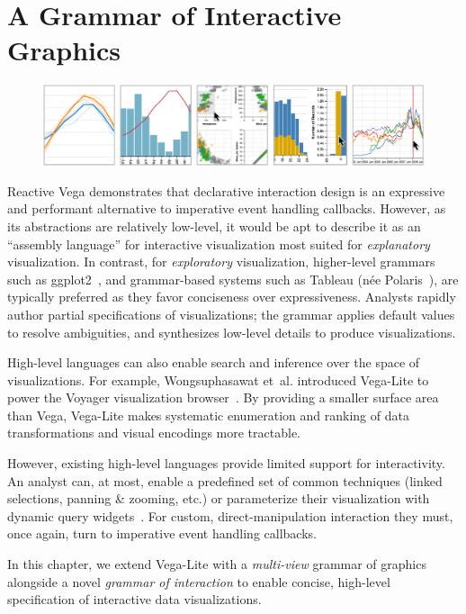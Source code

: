 \graphicspath{{./vega-lite/figures/}}
\chapter{A Grammar of Interactive Graphics}

\begin{figure}[h!]
  \vspace{-30pt}
  \centering
  \includegraphics[width=\columnwidth]{teaser}
\end{figure}


Reactive Vega demonstrates that declarative interaction design is an expressive
and performant alternative to imperative event handling callbacks. However, as
its abstractions are relatively low-level, it would be apt to describe it as an
``assembly language'' for interactive visualization most suited for
\emph{explanatory} visualization. In contrast, for \emph{exploratory}
visualization, higher-level grammars such as ggplot2~\cite{wickham:layered}, and
grammar-based systems such as Tableau (n\'ee Polaris~\cite{stolte:polaris}), are
typically preferred as they favor conciseness over expressiveness. Analysts
rapidly author partial specifications of visualizations; the grammar applies
default values to resolve ambiguities, and synthesizes low-level details to
produce visualizations.

High-level languages can also enable search and inference over the space of
visualizations. For example, Wongsuphasawat et~al. introduced Vega-Lite to power
the Voyager visualization browser~\cite{voyager}. By providing a smaller surface
area than Vega, Vega-Lite makes systematic enumeration and ranking of data
transformations and visual encodings more tractable.

However, existing high-level languages provide limited support for
interactivity. An analyst can, at most, enable a predefined set of common
techniques (linked selections, panning \& zooming, etc.) or parameterize their
visualization with dynamic query widgets~\cite{shiny}. For custom,
direct-manipulation interaction they must, once again, turn to imperative event
handling callbacks.

In this chapter, we extend Vega-Lite with a \emph{multi-view} grammar of
graphics alongside a novel \emph{grammar of interaction} to enable concise,
high-level specification of interactive data visualizations.





